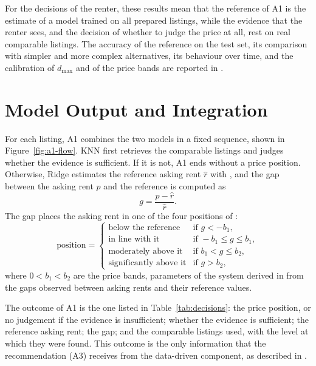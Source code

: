 \documentclass[12pt,a4paper]{report}
\begin{document}
For the decisions of the renter, these results mean that the reference of A1
is the estimate of a model trained on all prepared listings, while the
evidence that the renter sees, and the decision of whether to judge the price
at all, rest on real comparable listings. The accuracy of the reference on
the test set, its comparison with simpler and more complex alternatives, its
behaviour over time, and the calibration of $d_{\max}$ and of the price bands
are reported in .

\section{Model Output and Integration}
\label{sec:datadriven-integration}

For each listing, A1 combines the two models in a fixed sequence, shown in
Figure~\ref{fig:a1-flow}. KNN first retrieves the comparable listings and
judges whether the evidence is sufficient. If it is not, A1 ends without a
price position. Otherwise, Ridge estimates the reference asking rent
$\hat{r}$ with , and the gap between the asking rent $p$
and the reference is computed as
\begin{equation}
  g = \frac{p - \hat{r}}{\hat{r}}.
  \label{eq:gap}
\end{equation}
The gap places the asking rent in one of the four positions of
:
\begin{equation}
  \text{position} =
  \begin{cases}
    \text{below the reference} & \text{if } g < -b_{1},\\
    \text{in line with it} & \text{if } -b_{1} \leq g \leq b_{1},\\
    \text{moderately above it} & \text{if } b_{1} < g \leq b_{2},\\
    \text{significantly above it} & \text{if } g > b_{2},
  \end{cases}
  \label{eq:bands}
\end{equation}
where $0 < b_{1} < b_{2}$ are the price bands, parameters of the system
derived in  from the gaps observed between asking rents
and their reference values.

The outcome of A1 is the one listed in Table~\ref{tab:decisions}: the price
position, or no judgement if the evidence is insufficient; whether the
evidence is sufficient; the reference asking rent; the gap; and the
comparable listings used, with the level at which they were found. This
outcome is the only information that the recommendation (A3) receives from
the data-driven component, as described in .
\end{document}
